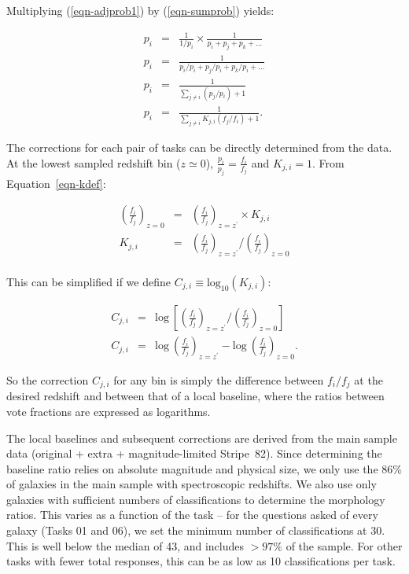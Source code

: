 \documentclass[useAMS,usenatbib]{mn2e}
\begin{document}
\noindent Multiplying (\ref{eqn-adjprob1}) by (\ref{eqn-sumprob}) yields:

\begin{eqnarray}
p_i &=& \frac{1}{1/p_i} \times \frac{1}{p_i + p_j + p_k + \dots} \\
p_i &=& \frac{1}{p_i/p_i + p_j/p_i + p_k/p_i + \dots} \\
p_i &=& \frac{1}{\sum\limits_{j\ne i}{(p_j/p_i)} + 1} \\
p_i &=& \frac{1}{\sum\limits_{j\ne i}{K_{j,i} (f_j/f_i)} + 1}.
\end{eqnarray}

The corrections for each pair of tasks can be directly determined from the data. At the lowest sampled redshift bin ($z\simeq0$), $\frac{p_i}{p_j} = \frac{f_i}{f_j}$ and $K_{j,i}=1$. From Equation~\ref{eqn-kdef}:

\begin{eqnarray}
\left(\frac{f_i}{f_j}\right)_{z=0} &=& \left(\frac{f_i}{f_j}\right)_{z=z^\prime}\times K_{j,i} \\
K_{j,i} &=& \left(\frac{f_i}{f_j}\right)_{z=z^\prime} / \left(\frac{f_i}{f_j}\right)_{z=0} \\
\end{eqnarray}

\noindent This can be simplified if we define $C_{j,i}\equiv\text{log}_{10}(K_{j,i})$:

\begin{eqnarray}
C_{j,i} &=& \text{log}~\left[\left(\frac{f_i}{f_j}\right)_{z=z^\prime} / \left(\frac{f_i}{f_j}\right)_{z=0}\right] \\
C_{j,i} &=& \text{log}~\left(\frac{f_i}{f_j}\right)_{z=z^\prime} - \text{log}~\left(\frac{f_i}{f_j}\right)_{z=0}.
\end{eqnarray}

\noindent So the correction $C_{j,i}$ for any bin is simply the difference between $f_i/f_j$ at the desired redshift and between that of a local baseline, where the ratios between vote fractions are expressed as logarithms.  

The local baselines and subsequent corrections are derived from the main sample data (original + extra + magnitude-limited Stripe~82). Since determining the baseline ratio relies on absolute magnitude and physical size, we only use the 86\% of galaxies in the main sample with spectroscopic redshifts. We also use only galaxies with sufficient numbers of classifications to determine the morphology ratios. This varies as a function of the task -- for the questions asked of every galaxy (Tasks 01 and 06), we set the minimum number of classifications at 30. This is well below the median of 43, and includes $>97\%$ of the sample. For other tasks with fewer total responses, this can be as low as 10 classifications per task. 
\end{document}

